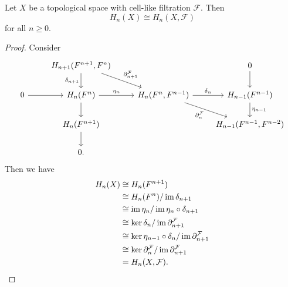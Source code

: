 \begin{theorem}
	Let $X$ be a topological space with cell-like filtration $\mathcal{F}$. Then
	\begin{equation*}
		H_n(X) \cong H_n(X,\mathcal{F})
	\end{equation*}
	\noindent for all $n \geq 0$.
\end{theorem}

\begin{proof}
	Consider
	\begin{equation*}
		\begin{tikzcd}
			& H_{n + 1}(F^{n + 1},F^n)\arrow[d,"\delta_{n + 1}"']\arrow[dr,"\partial^\mathcal{F}_{n + 1}"] & & 0\arrow[d]\\
			0 \arrow[r] & H_n(F^n)\arrow[d] \arrow[r,"\eta_n"] & H_n(F^n,F^{n - 1})\arrow[dr,"\partial^\mathcal{F}_n"'] \arrow[r,"\delta_n"] & H_{n - 1}(F^{n - 1})\arrow[d,"\eta_{n - 1}"]\\
			& H_n(F^{n + 1})\arrow[d] & & H_{n - 1}(F^{n - 1},F^{n - 2})\\
			& 0.
		\end{tikzcd}
	\end{equation*}
	Then we have 
	\begin{align*}
		H_n(X) &\cong H_n(F^{n + 1})\\
		&\cong H_n(F^n)/\operatorname{im} \delta_{n + 1}\\
		&\cong \operatorname{im} \eta_n/\operatorname{im} \eta_n \circ \delta_{n + 1}\\
		&\cong \ker \delta_n/\operatorname{im} \partial^\mathcal{F}_{n + 1}\\
		&\cong \ker \eta_{n - 1}\circ \delta_n/ \operatorname{im} \partial^\mathcal{F}_{n + 1}\\
		&\cong \ker \partial^\mathcal{F}_n/\operatorname{im} \partial^\mathcal{F}_{n + 1}\\
		&= H_n(X,\mathcal{F}).
	\end{align*}
\end{proof}
